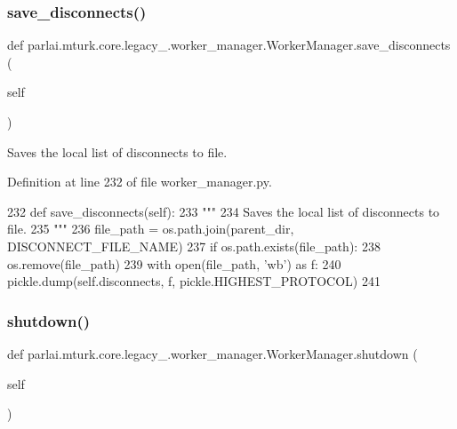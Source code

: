 \subsubsection{\texorpdfstring{save\+\_\+disconnects()}{save\_disconnects()}}
{\footnotesize\ttfamily def parlai.\+mturk.\+core.\+legacy\+\_.\+worker\+\_\+manager.\+Worker\+Manager.\+save\+\_\+disconnects (\begin{DoxyParamCaption}\item[{}]{self }\end{DoxyParamCaption})}

\begin{DoxyVerb}Saves the local list of disconnects to file.
\end{DoxyVerb}
 

Definition at line 232 of file worker\+\_\+manager.\+py.


\begin{DoxyCode}
232     \textcolor{keyword}{def }save\_disconnects(self):
233         \textcolor{stringliteral}{"""}
234 \textcolor{stringliteral}{        Saves the local list of disconnects to file.}
235 \textcolor{stringliteral}{        """}
236         file\_path = os.path.join(parent\_dir, DISCONNECT\_FILE\_NAME)
237         \textcolor{keywordflow}{if} os.path.exists(file\_path):
238             os.remove(file\_path)
239         with open(file\_path, \textcolor{stringliteral}{'wb'}) \textcolor{keyword}{as} f:
240             pickle.dump(self.disconnects, f, pickle.HIGHEST\_PROTOCOL)
241 
\end{DoxyCode}
\mbox{\label{classparlai_1_1mturk_1_1core_1_1legacy__2018_1_1worker__manager_1_1WorkerManager_a49e820a0aa2eb8a320f32126b279ca10}} 
\subsubsection{\texorpdfstring{shutdown()}{shutdown()}}
{\footnotesize\ttfamily def parlai.\+mturk.\+core.\+legacy\+\_.\+worker\+\_\+manager.\+Worker\+Manager.\+shutdown (\begin{DoxyParamCaption}\item[{}]{self }\end{DoxyParamCaption})}

